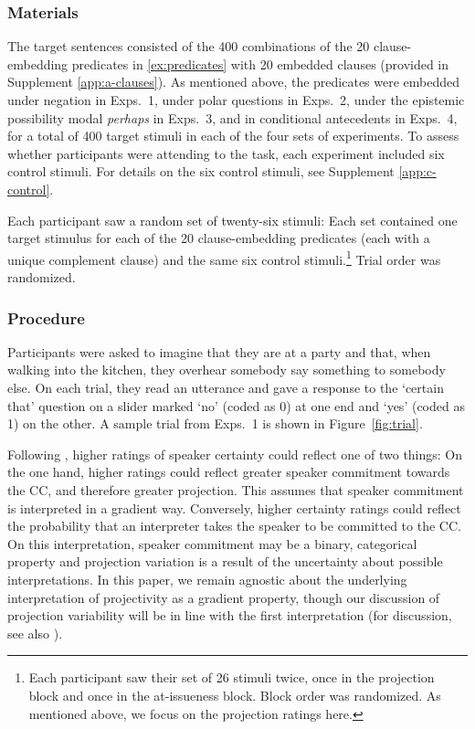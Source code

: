 \documentclass[a4paper,12pt,twoside]{article}
\begin{document}
		\subsubsection{Materials}

            The target sentences consisted of the 400 combinations of the 20 clause-embedding predicates in \ref{ex:predicates} with 20 embedded clauses (provided in Supplement \ref{app:a-clauses}). As mentioned above, the predicates were embedded under negation in Exps.~1, under polar questions in Exps.~2, under the epistemic possibility modal \emph{perhaps} in Exps.~3, and in conditional antecedents in Exps.~4, for a total of 400 target stimuli in each of the four sets of experiments. To assess whether participants were attending to the task, each experiment included six control stimuli. For details on the six control stimuli, see Supplement \ref{app:c-control}.

            Each participant saw a random set of twenty-six stimuli: Each set contained one target stimulus for each of the 20 clause-embedding predicates (each with a unique complement clause) and the same six control stimuli.\footnote{Each participant saw their set of 26 stimuli twice, once in the projection block and once in the at-issueness block. Block order was randomized. As mentioned above, we focus on the projection ratings here.} Trial order was randomized.
		
        \subsubsection{Procedure}
            Participants were asked to imagine that they are at a party and that, when walking into the kitchen, they overhear somebody say something to somebody else.
            On each trial, they read an utterance and gave a response to the `certain that' question on a slider marked `no' (coded as 0) at one end and `yes' (coded as 1) on the other. A sample trial from Exps.~1 is shown in Figure~\ref{fig:trial}. 
            
            Following \citet{tonhauser_how_2018}, higher ratings of speaker certainty could reflect one of two things: On the one hand, higher ratings could reflect greater speaker commitment towards the CC, and therefore greater projection. This assumes that speaker commitment is interpreted in a gradient way.
            Conversely, higher certainty ratings could reflect the probability that an interpreter takes the speaker to be committed to the CC.  On this interpretation, speaker commitment may be a binary, categorical property and projection variation is a result of the uncertainty about possible interpretations. %
            In this paper, we remain agnostic about the underlying interpretation of projectivity as a gradient property, though our discussion of projection variability will be in line with the first interpretation (for discussion, see also \citealt{grove_factivity_2023}).
            
\end{document}

